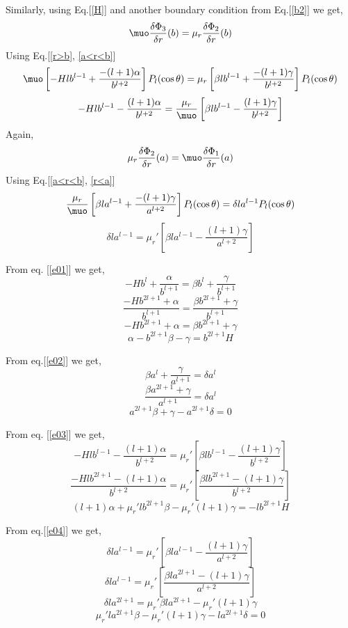Similarly, using Eq.[\ref{H}] and another boundary condition from Eq.[\ref{b2}] we get,
$$\muo\frac{\delta \Phi_3}{\delta r}(b)=\mu_r\frac{\delta \Phi_2}{\delta r}(b)$$
Using Eq.[\ref{r>b}, \ref{a<r<b}]
$$\muo\left[-Hlb^{l-1}+\frac{-(l+1)\alpha}{b^{l+2}}\right]P_l(\cos\theta)=\mu_r\left[\beta l b^{l-1}+\frac{-(l+1)\gamma}{b^{l+2}}\right]P_l(\cos\theta)$$
\begin{equation}\label{e03}
-Hlb^{l-1}-\frac{(l+1)\alpha}{b^{l+2}}=\frac{\mu_r}{\muo}\left[\beta l b^{l-1}-\frac{(l+1)\gamma}{b^{l+2}}\right]
\end{equation}
Again,
$$\mu_r\frac{\delta \Phi_2}{\delta r}(a)=\muo\frac{\delta \Phi_1}{\delta r}(a)$$
Using Eq.[\ref{a<r<b}, \ref{r<a}]
$$\frac{\mu_r}{\muo}\left[\beta l a^{l-1}+\frac{-(l+1)\gamma}{a^{l+2}}\right]P_l(\cos\theta)=\delta l a^{l-1} P_l(\cos\theta)$$
\begin{equation}\label{e04}
\delta l a^{l-1}=\mu_r'\left[\beta l a^{l-1}-\frac{(l+1)\gamma}{a^{l+2}}\right]
\end{equation}

From eq. [\ref{e01}] we get,
$$-Hb^l+\frac{\alpha}{b^{l+1}}=\beta b^l+\frac{\gamma}{b^{l+1}}$$
$$\frac{-Hb^{2l+1}+\alpha}{b^{l+1}}=\frac{\beta b^{2l+1}+\gamma}{b^{l+1}}$$
$$-Hb^{2l+1}+\alpha=\beta b^{2l+1}+\gamma$$
\begin{equation}
\alpha- b^{2l+1}\beta-\gamma=b^{2l+1}H
\end{equation}

From eq.[\ref{e02}] we get,
$$\beta a^l+\frac{\gamma}{a^{l+1}}=\delta a^l$$
$$\frac{\beta a^{2l+1}+\gamma}{a^{l+1}}=\delta a^l$$
\begin{equation}
 a^{2l+1}\beta+\gamma-a^{2l+1}\delta =0
\end{equation}

From eq. [\ref{e03}] we get,
$$-Hlb^{l-1}-\frac{(l+1)\alpha}{b^{l+2}}=\mu_r'\left[\beta l b^{l-1}-\frac{(l+1)\gamma}{b^{l+2}}\right]$$
$$\frac{-Hlb^{2l+1}-(l+1)\alpha}{b^{l+2}}=\mu_r'\left[\frac{\beta l b^{2l+1}-(l+1)\gamma}{b^{l+2}}\right]$$
\begin{equation}
(l+1)\alpha+\mu_r' l b^{2l+1}\beta-\mu_r'(l+1)\gamma=-lb^{2l+1}H
\end{equation}

From eq.[\ref{e04}] we get,
$$\delta l a^{l-1}=\mu_r'\left[\beta l a^{l-1}-\frac{(l+1)\gamma}{a^{l+2}}\right]$$
$$\delta l a^{l-1}=\mu_r'\left[\frac{\beta l a^{2l+1}-(l+1)\gamma}{a^{l+2}}\right]$$
$$\delta l a^{2l+1}=\mu_r'\beta l a^{2l+1}-\mu_r'(l+1)\gamma$$
\begin{equation}
\mu_r'l a^{2l+1}\beta -\mu_r'(l+1)\gamma- l a^{2l+1}\delta=0
\end{equation}


